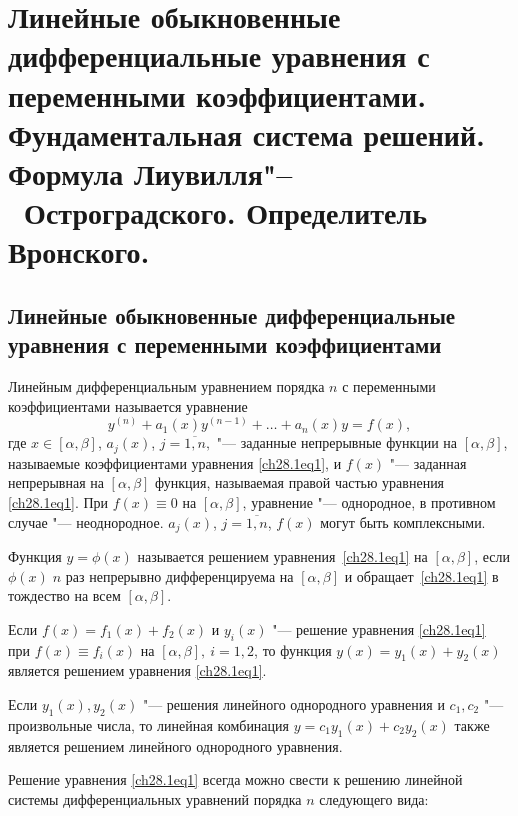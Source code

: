 \chapter{Линейные обыкновенные дифференциальные уравнения с переменными коэффициентами. Фундаментальная система решений. Формула Лиувилля"--~Остроградского. Определитель Вронского.}

\section{Линейные обыкновенные дифференциальные уравнения с переменными коэффициентами}

Линейным дифференциальным уравнением порядка $n$ с переменными коэффициентами называется уравнение 
\begin{equation} \label{ch28.1eq1}
y^{(n)} + a_1(x)y^{(n - 1)} + \ldots + a_n(x)y = f(x),
\end{equation}
где $x \in [\alpha, \beta]$, $a_j(x)$, $j = \overline{1,n},$ "--- заданные непрерывные функции на $[\alpha, \beta]$, называемые коэффициентами уравнения \eqref{ch28.1eq1}, и $f(x)$ "--- заданная непрерывная на $[\alpha, \beta]$ функция, называемая правой частью уравнения \eqref{ch28.1eq1}. При $f(x) \equiv 0$ на $[\alpha, \beta]$, уравнение "--- однородное, в противном случае "--- неоднородное. $a_j(x)$, $j = \overline{1,n}$, $f(x)$ могут быть комплексными.

Функция $y = \phi(x)$ называется решением уравнения~\eqref{ch28.1eq1} на $[\alpha, \beta]$, если $\phi(x) \; n$ раз непрерывно дифференцируема на $[\alpha, \beta]$ и обращает~\eqref{ch28.1eq1} в тождество на всем $[\alpha, \beta]$.

\begin{lemm}
Если $f(x) = f_1(x) + f_2(x)$ и $y_i(x)$ "--- решение уравнения \eqref{ch28.1eq1} при $f(x) \equiv f_i(x)$ на $[\alpha, \beta], \: i = 1,2$, то функция $y(x) = y_1(x) + y_2(x)$ является решением уравнения \eqref{ch28.1eq1}.
\end{lemm}  

\begin{cons}
Если $y_1(x), y_2(x)$ "--- решения линейного однородного уравнения и $c_1, c_2$ "--- произвольные числа, то линейная комбинация $y = c_1y_1(x) + c_2y_2(x)$ также является решением линейного однородного уравнения.
\end{cons}

Решение уравнения \eqref{ch28.1eq1} всегда можно свести к решению линейной системы дифференциальных уравнений порядка $n$ следующего вида:

